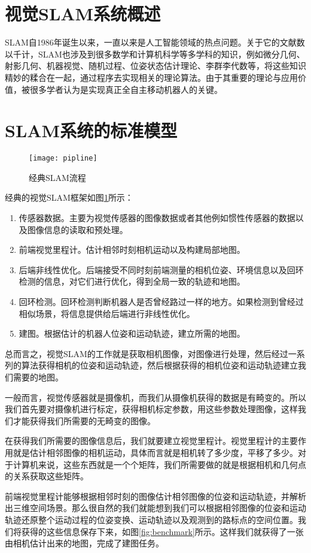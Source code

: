 \section{视觉SLAM系统概述}
SLAM自1986年诞生以来，一直以来是人工智能领域的热点问题。关于它的文献数以千计，SLAM也涉及到很多数学和计算机科学等多学科的知识，例如微分几何、射影几何、机器视觉、随机过程、位姿状态估计理论、李群李代数等，将这些知识精妙的糅合在一起，通过程序去实现相关的理论算法。由于其重要的理论与应用价值，被很多学者认为是实现真正全自主移动机器人的关键。
\par
\section{SLAM系统的标准模型}
\begin{figure}[htbp]
	\centering
	\texttt{[image: pipline]}
	\caption{经典SLAM流程}
	\label{fig:pipline}
\end{figure}\par
经典的视觉SLAM框架如图\ref{fig:pipline}所示：\par
\begin{enumerate}
	\item 传感器数据。主要为视觉传感器的图像数据或者其他例如惯性传感器的数据以及图像信息的读取和预处理。
	\item 前端视觉里程计。估计相邻时刻相机运动以及构建局部地图。
	\item 后端非线性优化。后端接受不同时刻前端测量的相机位姿、环境信息以及回环检测的信息，对它们进行优化，得到全局一致的轨迹和地图。
	\item 回环检测。回环检测判断机器人是否曾经路过一样的地方。如果检测到曾经过相似场景，将信息提供给后端进行非线性优化。
	\item 建图。根据估计的机器人位姿和运动轨迹，建立所需的地图。
\end{enumerate}
总而言之，视觉SLAM的工作就是获取相机图像，对图像进行处理，然后经过一系列的算法获得相机的位姿和运动轨迹，然后根据获得的相机位姿和运动轨迹建立我们需要的地图。\par
一般而言，视觉传感器就是摄像机，而我们从摄像机获得的数据是有畸变的。所以我们首先要对摄像机进行标定，获得相机标定参数，用这些参数处理图像，这样我们才能获得我们所需要的无畸变的图像。\par
在获得我们所需要的图像信息后，我们就要建立视觉里程计。视觉里程计的主要作用就是估计相邻图像的相机运动，具体而言就是相机转了多少度，平移了多少。对于计算机来说，这些东西就是一个个矩阵，我们所需要做的就是根据相机和几何点的关系获取这些矩阵。\par
前端视觉里程计能够根据相邻时刻的图像估计相邻图像的位姿和运动轨迹，并解析出三维空间场景。那么很自然的我们就能想到我们可以根据相邻图像的位姿和运动轨迹还原整个运动过程的位姿变换、运动轨迹以及观测到的路标点的空间位置。我们将获得的这些信息保存下来，如图\ref{fig:benchmark}所示。这样我们就获得了一张由相机估计出来的地图，完成了建图任务。
